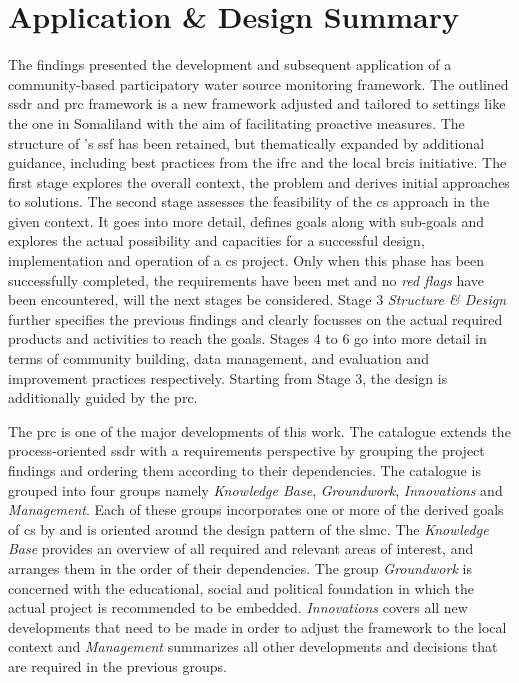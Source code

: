 \section{Application \& Design Summary}

The findings presented the development and subsequent application of a community-based participatory water source monitoring framework. The outlined \acrfull{ssdr} and \acrshort{prc} framework is a new framework adjusted and tailored to settings like the one in Somaliland with the aim of facilitating proactive measures.\newline
The structure of \citeauthor{fraislCitizenScienceEnvironmental2022}'s \citeyear{fraislCitizenScienceEnvironmental2022} \acrshort{ssf} has been retained, but thematically expanded by additional guidance, including best practices from the \acrshort{ifrc} and the local \acrshort{brcis} initiative. The first stage explores the overall context, the problem and derives initial approaches to solutions. The second stage assesses the feasibility of the \acrlong{cs} approach in the given context. It goes into more detail, defines goals along with sub-goals and explores the actual possibility and capacities for a successful design, implementation and operation of a \acrshort{cs} project. Only when this phase has been successfully completed, the requirements have been met and no \textit{red flags} have been encountered, will the next stages be considered. Stage 3 \textit{Structure \& Design} further specifies the previous findings and clearly focusses on the actual required products and activities to reach the goals. Stages 4 to 6 go into more detail in terms of community building, data management, and evaluation and improvement practices respectively. Starting from Stage 3, the design is additionally guided by the \acrfull{prc}.

The \acrshort{prc} is one of the major developments of this work. The catalogue extends the process-oriented \acrshort{ssdr} with a requirements perspective by grouping the project findings and ordering them according to their dependencies. The catalogue is grouped into four groups namely \textit{Knowledge Base}, \textit{Groundwork}, \textit{Innovations} and \textit{Management}. Each of these groups incorporates one or more of the derived goals of \acrlong{cs} by \textcite{minkmanCitizenScienceWater2015} and is oriented around the design pattern of the \acrlong{slmc}. The \textit{Knowledge Base} provides an overview of all required and relevant areas of interest, and arranges them in the order of their dependencies. The group \textit{Groundwork} is concerned with the educational, social and political foundation in which the actual project is recommended to be embedded. \textit{Innovations} covers all new developments that need to be made in order to adjust the framework to the local context and \textit{Management} summarizes all other developments and decisions that are required in the previous groups.

